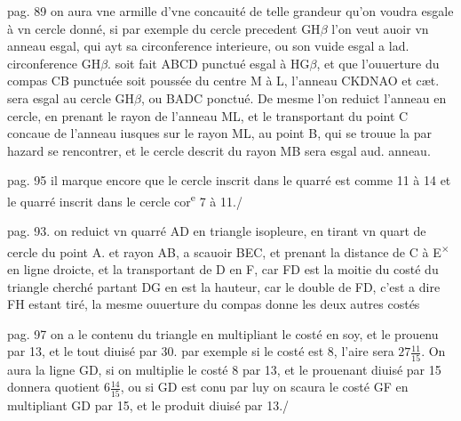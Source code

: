 \documentclass[11pt,a4paper]{article}
\begin{document}
pag. 89 on aura vne armille d'vne concauité de telle grandeur qu'on voudra esgale à vn cercle donné, si par exemple du cercle precedent GH$\beta$ l'on veut auoir vn anneau esgal, qui ayt sa circonference  interieure, ou son vuide esgal a lad. circonference GH$\beta$. soit fait ABCD punctué esgal à HG$\beta$, et que l'ouuerture du compas CB punctuée soit poussée du centre M à L, l'anneau CKDNAO et cæt. sera esgal au cercle GH$\beta$, ou BADC ponctué. De mesme l'on reduict l'anneau en cercle, en prenant le rayon de l'anneau ML, et le transportant du point C concaue de l'anneau iusques sur le rayon ML, au point B, qui se trouue la par hazard se rencontrer, et le cercle descrit du rayon MB sera esgal aud. anneau.

pag. 95 il marque encore que le cercle inscrit dans le quarré est comme 11 à 14 et le quarré inscrit dans le cercle cor\textsuperscript{e} 7 à 11./


pag. 93. on reduict vn quarré AD en triangle isopleure, en tirant vn quart de cercle du point A. et rayon AB, a scauoir BEC, et prenant la distance de C  à E\textsuperscript{$\times$} en ligne droicte, et la transportant de D en F, \struck{\ill{}} car FD est la moitie du costé du triangle cherché partant DG en est la hauteur, car le double de FD, c'est a dire FH estant tiré, la mesme ouuerture du compas donne les deux autres costés

pag. 97 on a le contenu du triangle en multipliant le costé en soy, et le prouenu par 13, et le tout diuisé par 30. par exemple si le costé est 8, l'aire sera $27\frac{11}{15}$. On aura la ligne GD, si on multiplie le costé 8 par 13, et le prouenant diuisé par 15 donnera quotient $6\frac{14}{15}$, ou si GD est conu par luy on scaura le costé GF en multipliant GD par 15, et le produit diuisé par 13./
\end{document}
